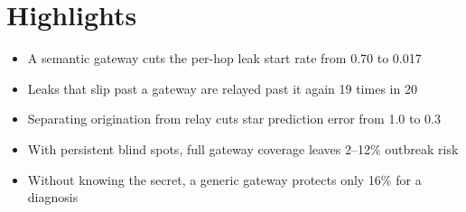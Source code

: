 \documentclass[preprint,12pt,authoryear]{elsarticle}
\newenvironment{highlights}{\section*{Highlights}\begin{itemize}}{\end{itemize}}%
\begin{document}
\begin{highlights}
\item A semantic gateway cuts the per-hop leak start rate from 0.70 to 0.017
\item Leaks that slip past a gateway are relayed past it again 19 times in 20
\item Separating origination from relay cuts star prediction error from 1.0 to 0.3
\item With persistent blind spots, full gateway coverage leaves 2--12\% outbreak risk
\item Without knowing the secret, a generic gateway protects only 16\% for a diagnosis
\end{highlights}
\end{document}
